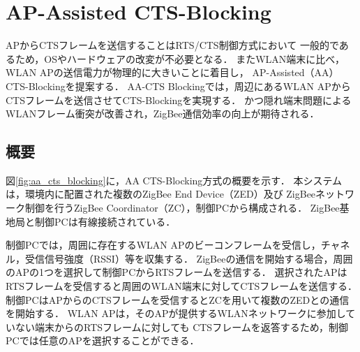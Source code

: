 \documentclass[technicalreport]{ieicej}
\begin{document}

\section{AP-Assisted CTS-Blocking}
\label{sec:aa_cts}

APからCTSフレームを送信することはRTS/CTS制御方式において
一般的であるため，OSやハードウェアの改変が不必要となる．
またWLAN端末に比べ，WLAN APの送信電力が物理的に大きいことに着目し，
AP-Assisted（AA）CTS-Blockingを提案する． 
AA-CTS Blockingでは，周辺にあるWLAN APからCTSフレームを送信させてCTS-Blockingを実現する．
かつ隠れ端末問題によるWLANフレーム衝突が改善され，ZigBee通信効率の向上が期待される．

\subsection{概要}
\label{ssec:outline}

図\ref{fig:aa_cts_blocking}に，AA CTS-Blocking方式の概要を示す．
本システムは，環境内に配置された複数のZigBee End Device（ZED）及び
ZigBeeネットワーク制御を行うZigBee Coordinator（ZC），制御PCから構成される．
ZigBee基地局と制御PCは有線接続されている．

制御PCでは，周囲に存在するWLAN APのビーコンフレームを受信し，チャネル，受信信号強度（RSSI）等を収集する．
ZigBeeの通信を開始する場合，周囲のAPの1つを選択して制御PCからRTSフレームを送信する．
選択されたAPはRTSフレームを受信すると周囲のWLAN端末に対してCTSフレームを送信する．
制御PCはAPからのCTSフレームを受信するとZCを用いて複数のZEDとの通信を開始する．
WLAN APは，そのAPが提供するWLANネットワークに参加していない端末からのRTSフレームに対しても
CTSフレームを返答するため，制御PCでは任意のAPを選択することができる．
\end{document}

